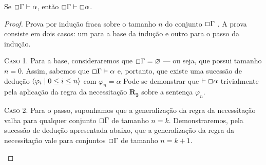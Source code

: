    \begin{theorem}\label{gen-nec}
        Se $\Box\Gamma\mathrel{\vdash}\alpha$, então $\Box\Gamma\mathrel{\vdash}\Box\alpha$.

        \begin{proof}
            Prova por indução fraca sobre o tamanho $n$ do conjunto $\Box\Gamma$ \citep{Troelstra}. A prova consiste em dois casos: um para a base da indução e outro para o passo da indução.

            \begin{case}
                \textsc{Caso 1.} Para a base, consideraremos que $\Box\Gamma=\varnothing$ --- ou seja, que possui tamanho $n=0$.
                Assim, sabemos que $\Box\Gamma\mathrel{\vdash}\alpha$ e, portanto, que existe uma sucessão de dedução $\langle\varphi_i\mid 0\leq i\leq n\rangle$ com $\varphi_n=\alpha$
                Pode-se demonstrar que $\mathrel{\vdash}\Box\alpha$ trivialmente pela aplicação da regra da necessitação \hyperref[necessitation]{$\mathbf{R_2}$} sobre a sentença $\varphi_n$.
            \end{case}

            \begin{case}
                \textsc{Caso 2.} 
                Para o passo, suponhamos que a generalização da regra da necessitação valha para qualquer conjunto $\Box\Gamma$ de tamanho $n=k$.
                Demonstraremos, pela sucessão de dedução apresentada abaixo, que a generalização da regra da necessitação vale para conjuntos $\Box\Gamma$ de tamanho $n=k+1$.


\end{case}
\end{proof}
\end{theorem}
